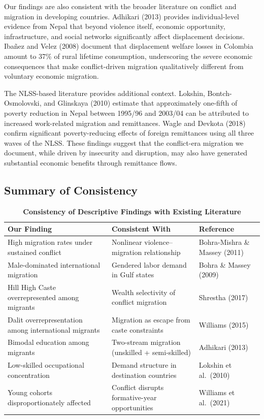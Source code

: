 \documentclass[12pt,letterpaper]{article}
\begin{document}
Our findings are also consistent with the broader literature on conflict and migration in developing countries. Adhikari (2013) provides individual-level evidence from Nepal that beyond violence itself, economic opportunity, infrastructure, and social networks significantly affect displacement decisions. Iba\~{n}ez and Velez (2008) document that displacement welfare losses in Colombia amount to 37\% of rural lifetime consumption, underscoring the severe economic consequences that make conflict-driven migration qualitatively different from voluntary economic migration.

The NLSS-based literature provides additional context. Lokshin, Bontch-Osmolovski, and Glinskaya (2010) estimate that approximately one-fifth of poverty reduction in Nepal between 1995/96 and 2003/04 can be attributed to increased work-related migration and remittances. Wagle and Devkota (2018) confirm significant poverty-reducing effects of foreign remittances using all three waves of the NLSS. These findings suggest that the conflict-era migration we document, while driven by insecurity and disruption, may also have generated substantial economic benefits through remittance flows.

\subsection{Summary of Consistency}

\begin{table}[H]
\centering
\caption*{\textbf{Consistency of Descriptive Findings with Existing Literature}}
\footnotesize
\begin{tabular}{@{}p{5.5cm} p{4cm} p{4.5cm}@{}}
\toprule
\textbf{Our Finding} & \textbf{Consistent With} & \textbf{Reference} \\
\midrule
High migration rates under sustained conflict & Nonlinear violence--migration relationship & Bohra-Mishra \& Massey (2011) \\[4pt]
Male-dominated international migration & Gendered labor demand in Gulf states & Bohra \& Massey (2009) \\[4pt]
Hill High Caste overrepresented among migrants & Wealth selectivity of conflict migration & Shrestha (2017) \\[4pt]
Dalit overrepresentation among international migrants & Migration as escape from caste constraints & Williams (2015) \\[4pt]
Bimodal education among migrants & Two-stream migration (unskilled + semi-skilled) & Adhikari (2013) \\[4pt]
Low-skilled occupational concentration & Demand structure in destination countries & Lokshin et al.\ (2010) \\[4pt]
Young cohorts disproportionately affected & Conflict disrupts formative-year opportunities & Williams et al.\ (2021) \\
\bottomrule
\end{tabular}
\end{table}
\end{document}
